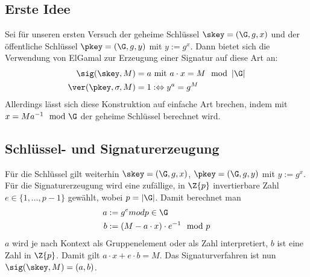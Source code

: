 \subsection{Erste Idee}
Sei für unseren ersten Versuch der geheime Schlüssel $\skey = (\G, g,
x)$ und der öffentliche Schlüssel $\pkey = (\G, g, y)$ mit $y := g^{x}$. Dann bietet
sich die Verwendung von ElGamal zur Erzeugung einer Signatur auf diese
Art an: 
\begin{align*}
\sig(\skey,M) &= a \text{ mit } a \cdot x = M \mod \left|\G\right|\\
\ver(\pkey,\sigma,M) &= 1 :\Leftrightarrow y^a = g^M
\end{align*}
Allerdings lässt sich diese Konstruktion auf einfache Art brechen, indem
mit $x = M a^{-1} \mod \G$ der geheime Schlüssel berechnet wird. 

\subsection{Schlüssel- und Signaturerzeugung}
Für die Schlüssel gilt weiterhin $\skey = (\G, g,
x)$, $\pkey = (\G, g, y)$ mit $y := g^{x}$. 
Für die Signaturerzeugung wird eine zufällige, in $\Z{p}$ invertierbare
Zahl $e \in \{1, \dots, p - 1\}$ gewählt,
wobei $p=|\G|$. Damit berechnet man 
\begin{align*}
a &:= g^e mod p \in \G\\
b &:= (M - a \cdot x) \cdot e^{-1} \mod p
\end{align*}
$a$ wird je nach Kontext als Gruppenelement oder als Zahl interpretiert, $b$
ist eine Zahl in $\Z{p}$.  
Damit gilt $a \cdot x + e \cdot b = M$. Das Signaturverfahren ist nun
$\sig(\skey,M) = (a, b)$.


